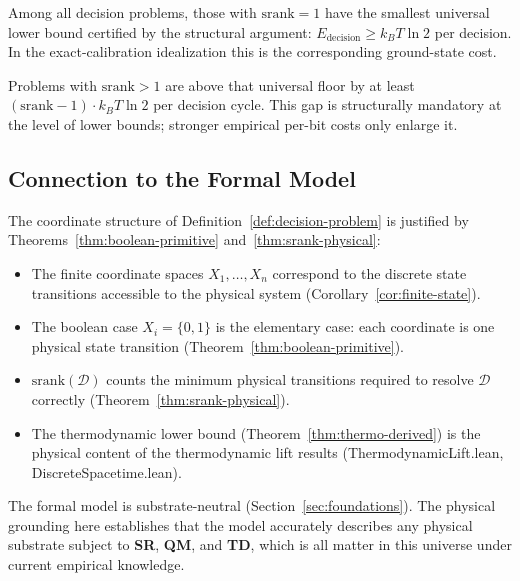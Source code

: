 \begin{corollary}[srank $= 1$ is the Energy Ground State]\label{cor:ground-state}
Among all decision problems, those with $\mathrm{srank} = 1$ have the smallest
universal lower bound certified by the structural argument:
$E_{\mathrm{decision}} \geq k_B T \ln 2$ per decision. In the exact-calibration
idealization this is the corresponding ground-state cost.

Problems with $\mathrm{srank} > 1$ are above that universal floor by at least
$(\mathrm{srank} - 1) \cdot k_B T \ln 2$ per decision cycle. This gap is
structurally mandatory at the level of lower bounds; stronger empirical
per-bit costs only enlarge it.
\end{corollary}

\subsection{Connection to the Formal Model}\label{sec:physical-to-formal}

The coordinate structure of Definition~\ref{def:decision-problem} is justified
by Theorems~\ref{thm:boolean-primitive} and~\ref{thm:srank-physical}:

\begin{itemize}
\item The finite coordinate spaces $X_1, \ldots, X_n$ correspond to the
  discrete state transitions accessible to the physical system
  (Corollary~\ref{cor:finite-state}).

\item The boolean case $X_i = \{0,1\}$ is the elementary case:
  each coordinate is one physical state transition
  (Theorem~\ref{thm:boolean-primitive}).

\item $\mathrm{srank}(\mathcal{D})$ counts the minimum physical transitions
  required to resolve $\mathcal{D}$ correctly
  (Theorem~\ref{thm:srank-physical}).

\item The thermodynamic lower bound (Theorem~\ref{thm:thermo-derived})
  is the physical content of the thermodynamic lift results
  (ThermodynamicLift.lean, DiscreteSpacetime.lean).
\end{itemize}

The formal model is substrate-neutral (Section~\ref{sec:foundations}).
The physical grounding here establishes that the model accurately describes
any physical substrate subject to \textbf{SR}, \textbf{QM}, and \textbf{TD},
which is all matter in this universe under current empirical knowledge.

